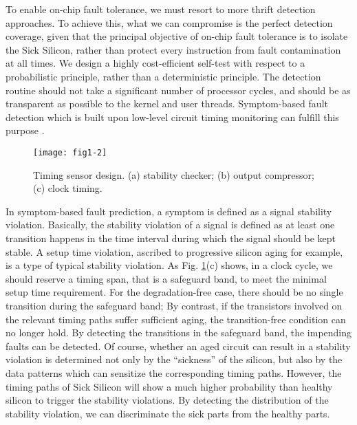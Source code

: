 To enable on-chip fault tolerance, we must resort to more thrift detection approaches. To achieve this, what we can compromise is the perfect detection coverage, given that the principal objective of on-chip fault tolerance is to isolate the Sick Silicon, rather than protect every instruction from fault contamination at all times. We design a highly cost-efficient self-test with respect to a probabilistic principle, rather than a deterministic principle. The detection routine should not take a significant number of processor cycles, and should be as transparent as possible to the kernel and user threads. Symptom-based fault detection which is built upon low-level circuit timing monitoring can fulfill this purpose \cite{yan2010svfd, wang2006restore}. 

\begin{figure}[t]
\centering
\texttt{[image: fig1-2]}
\caption{Timing sensor design. (a) stability checker; (b) output compressor; (c) clock timing.}
\label{fig:timing-sensor} 
\end{figure}


In symptom-based fault prediction, a symptom is defined as a signal stability violation. Basically, the stability violation of a signal is defined as at least one transition happens in the time interval during which the signal should be kept stable. A setup time violation, ascribed to progressive silicon aging for example, is a type of typical stability violation. As Fig. \ref{fig:timing-sensor}(c) shows, in a clock cycle, we should reserve a timing span, that is a safeguard band, to meet the minimal setup time requirement. For the degradation-free case, there should be no single transition during the safeguard band; By contrast, if the transistors involved on the relevant timing paths suffer sufficient aging, the transition-free condition can no longer hold. By detecting the transitions in the safeguard band, the impending faults can be detected. Of course, whether an aged circuit can result in a stability violation is determined not only by the “sickness” of the silicon, but also by the data patterns which can sensitize the corresponding timing paths. However, the timing paths of Sick Silicon will show a much higher probability than healthy silicon to trigger the stability violations. By detecting the distribution of the stability violation, we can discriminate the sick parts from the healthy parts. 

